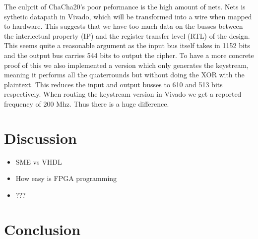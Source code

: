 \documentclass[a4paper, openany]{book}
\begin{document}
\begin{abstact}
\begin{table}[htbp]
\end{table}
The culprit of ChaCha20's poor peformance is the high amount of nets. Nets is sythetic datapath in Vivado, which will be transformed into a wire when mapped to hardware. This suggests that we have too much data on the busses between the interlectual property (IP) and the register transfer level (RTL) of the design. This seems quite a reasonable argument as the input bus itself takes in 1152 bits and the output bus carries 544 bits to output the cipher.
To have a more concrete proof of this we also implemented a version which only generates the keystream, meaning it performs all the quaterrounds but without doing the XOR with the plaintext. This reduces the input and output busses to 610 and 513 bits respectively. When routing the keystream version in Vivado we get a reported frequency of 200 Mhz. Thus there is a huge difference.

\chapter{Discussion}
\label{sec:org7c1394e}
\begin{itemize}
\item SME vs VHDL
\item How easy is FPGA programming
\item ???
\end{itemize}

\chapter{Conclusion}
\label{sec:org2f48346}




\begin{appendix}

\end{appendix}
\end{abstact}
\end{document}

